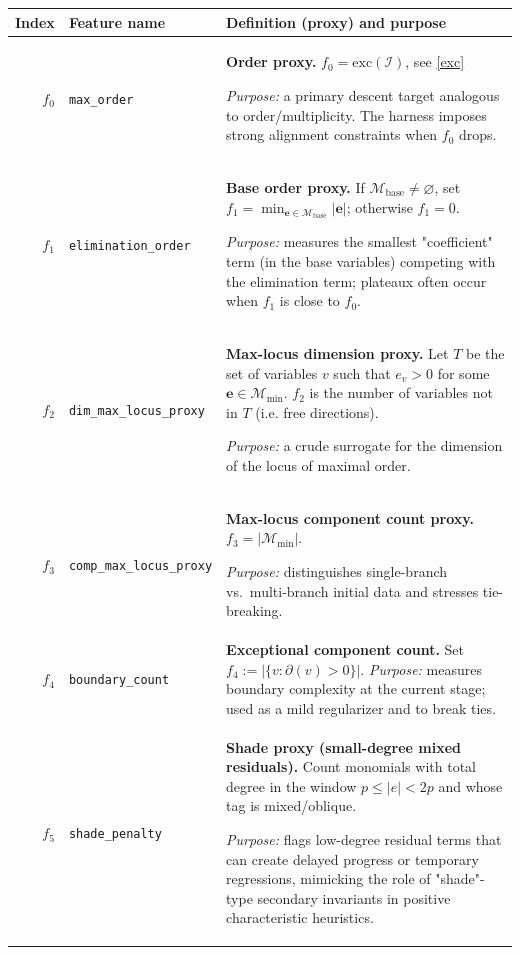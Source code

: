 \documentclass[11pt]{amsart}
\begin{document}
\begin{longtable}{@{}r p{} p{}@{}}
\toprule
Index & Feature name & Definition (proxy) and purpose \\
\midrule
\endhead

$f_0$ &
\texttt{max\_order} &
\textbf{Order proxy.}
$f_0=\mathrm{exc}(\mathcal{I})$, see \eqref{exc}

\emph{Purpose:} a primary descent target analogous to order/multiplicity. The harness imposes strong alignment
constraints when $f_0$ drops. \\[0.3em]

$f_1$ &
\texttt{elimination\_order} &
\textbf{Base order proxy.}
If $\mathcal M_{\mathrm{base}}\neq\varnothing$, set $f_1=\min_{\mathbf{e}\in\mathcal M_{\mathrm{base}}}|\mathbf{e}|$; otherwise $f_1=0$.

\emph{Purpose:} measures the smallest "coefficient" term (in the base variables) competing with the elimination term;
plateaux often occur when $f_1$ is close to $f_0$. \\[0.3em]

$f_2$ &
\texttt{dim\_max\_locus\_proxy} &
\textbf{Max-locus dimension proxy.}
Let $T$ be the set of variables $v$ such that $e_v>0$ for some $\mathbf{e} \in\mathcal M_{\min}$.
$f_2$ is the number of variables not in $T$ (i.e. free directions).

\emph{Purpose:} a crude surrogate for the dimension of the locus of maximal order. \\[0.3em]

$f_3$ &
\texttt{comp\_max\_locus\_proxy} &
\textbf{Max-locus component count proxy.}
$f_3=|\mathcal M_{\min}|$.

\emph{Purpose:} distinguishes single-branch vs.\ multi-branch initial data and stresses tie-breaking. \\[0.3em]

$f_4$ &
\texttt{boundary\_count} &
\textbf{Exceptional component count.}
Set $f_4:=|\{v:\partial(v)>0\}|$.
\emph{Purpose:} measures boundary complexity at the current stage; used as a mild regularizer and to break ties. \\[0.3em]

$f_5$ &
\texttt{shade\_penalty} &
\textbf{Shade proxy (small-degree mixed residuals).}
Count monomials with total degree in the window
$p\le |e|<2p$ and whose tag is mixed/oblique.

\emph{Purpose:} flags low-degree residual terms that can create delayed progress or temporary regressions, mimicking
the role of "shade"-type secondary invariants in positive characteristic heuristics. \\[0.3em]


\end{longtable}
\end{document}
